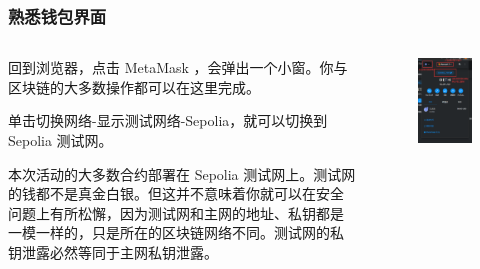 \documentclass{beamer}
\begin{document}
\begin{frame}
    \frametitle{熟悉钱包界面}

    

    \begin{columns}
        \begin{column}{0.55\textwidth}
            回到浏览器，点击 MetaMask ，会弹出一个小窗。你与区块链的大多数操作都可以在这里完成。

            单击切换网络-显示测试网络-Sepolia，就可以切换到 Sepolia 测试网。

            本次活动的大多数合约部署在 Sepolia 测试网上。测试网的钱都不是真金白银。但这并不意味着你就可以在安全问题上有所松懈，因为测试网和主网的地址、私钥都是一模一样的，只是所在的区块链网络不同。测试网的私钥泄露必然等同于主网私钥泄露。
        \end{column}

        \begin{column}{0.45\textwidth}
            \begin{figure}[t]
                \centering
                \includegraphics[width=\textwidth]{s1.png}
            \end{figure}
        \end{column}
    \end{columns}

\end{frame}
\end{document}
